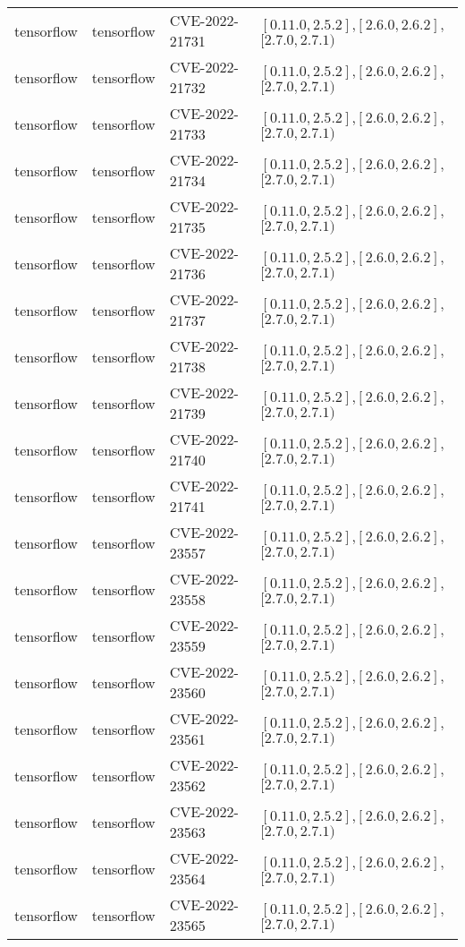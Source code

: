 \begin{tabular}{llll}
tensorflow & tensorflow & CVE-2022-21731 & $[0.11.0,2.5.2]$,$[2.6.0,2.6.2]$,$[2.7.0,2.7.1)$ \\
tensorflow & tensorflow & CVE-2022-21732 & $[0.11.0,2.5.2]$,$[2.6.0,2.6.2]$,$[2.7.0,2.7.1)$ \\
tensorflow & tensorflow & CVE-2022-21733 & $[0.11.0,2.5.2]$,$[2.6.0,2.6.2]$,$[2.7.0,2.7.1)$ \\
tensorflow & tensorflow & CVE-2022-21734 & $[0.11.0,2.5.2]$,$[2.6.0,2.6.2]$,$[2.7.0,2.7.1)$ \\
tensorflow & tensorflow & CVE-2022-21735 & $[0.11.0,2.5.2]$,$[2.6.0,2.6.2]$,$[2.7.0,2.7.1)$ \\
tensorflow & tensorflow & CVE-2022-21736 & $[0.11.0,2.5.2]$,$[2.6.0,2.6.2]$,$[2.7.0,2.7.1)$ \\
tensorflow & tensorflow & CVE-2022-21737 & $[0.11.0,2.5.2]$,$[2.6.0,2.6.2]$,$[2.7.0,2.7.1)$ \\
tensorflow & tensorflow & CVE-2022-21738 & $[0.11.0,2.5.2]$,$[2.6.0,2.6.2]$,$[2.7.0,2.7.1)$ \\
tensorflow & tensorflow & CVE-2022-21739 & $[0.11.0,2.5.2]$,$[2.6.0,2.6.2]$,$[2.7.0,2.7.1)$ \\
tensorflow & tensorflow & CVE-2022-21740 & $[0.11.0,2.5.2]$,$[2.6.0,2.6.2]$,$[2.7.0,2.7.1)$ \\
tensorflow & tensorflow & CVE-2022-21741 & $[0.11.0,2.5.2]$,$[2.6.0,2.6.2]$,$[2.7.0,2.7.1)$ \\
tensorflow & tensorflow & CVE-2022-23557 & $[0.11.0,2.5.2]$,$[2.6.0,2.6.2]$,$[2.7.0,2.7.1)$ \\
tensorflow & tensorflow & CVE-2022-23558 & $[0.11.0,2.5.2]$,$[2.6.0,2.6.2]$,$[2.7.0,2.7.1)$ \\
tensorflow & tensorflow & CVE-2022-23559 & $[0.11.0,2.5.2]$,$[2.6.0,2.6.2]$,$[2.7.0,2.7.1)$ \\
tensorflow & tensorflow & CVE-2022-23560 & $[0.11.0,2.5.2]$,$[2.6.0,2.6.2]$,$[2.7.0,2.7.1)$ \\
tensorflow & tensorflow & CVE-2022-23561 & $[0.11.0,2.5.2]$,$[2.6.0,2.6.2]$,$[2.7.0,2.7.1)$ \\
tensorflow & tensorflow & CVE-2022-23562 & $[0.11.0,2.5.2]$,$[2.6.0,2.6.2]$,$[2.7.0,2.7.1)$ \\
tensorflow & tensorflow & CVE-2022-23563 & $[0.11.0,2.5.2]$,$[2.6.0,2.6.2]$,$[2.7.0,2.7.1)$ \\
tensorflow & tensorflow & CVE-2022-23564 & $[0.11.0,2.5.2]$,$[2.6.0,2.6.2]$,$[2.7.0,2.7.1)$ \\
tensorflow & tensorflow & CVE-2022-23565 & $[0.11.0,2.5.2]$,$[2.6.0,2.6.2]$,$[2.7.0,2.7.1)$ \\

\end{tabular}

